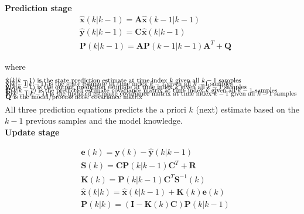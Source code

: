 \textbf{Prediction stage}
\begin{align}
	&\hat{\textbf{x}}	(k|k-1) = \textbf{A} 	\hat{\textbf{x}}(k-1|k-1)  				\label{eq:Kalman_pred_state} 	\\
	&\hat{\textbf{y}}	(k|k-1) = \textbf{C}	\hat{\textbf{x}}(k|k-1)										\label{eq:Kalman_pred_output} 	\\
	&\textbf{P}			(k|k-1) = \textbf{A}	\textbf{P}(k-1|k-1)\textbf{A}^T+\textbf{Q} 								\label{eq:Kalman_pred_cov} 		
\end{align}

where 
\begin{align*}
	&\text{$\hat{\textbf{x}}	(k|k-1)$ 	is the state prediction 			estimate at time index $k$ 		given all $ k-1 $ samples		}	\\[-1em]
	&\text{$\hat{\textbf{x}}	(k-1|k-1)$ 	is the state 						estimate at time index $k-1$ 	given all $ k-1 $ samples		}	\\[-1em]
	&\text{$\hat{\textbf{y}}	(k|k-1)$ 	is the output prediction 			estimate at time index $k$ 		given all $ k-1 $ samples		}	\\[-1em]
	&\text{$\textbf{P}			(k|k-1)$ 	is the predicted estimate  covariance matrix at time index $k$ 		given all $ k-1 $ samples		}	\\[-1em]
	&\text{$\textbf{P}			(k-1|k-1)$ 	is the updated estimate    covariance matrix at time index $k-1$ 	given all $ k-1 $ samples		}	\\[-1em]
	&\text{$\textbf{Q}$						is the model/process noise covariance matrix														}	\\[-1em]
\end{align*}

All three prediction equations predicts the a priori $k$ (next) estimate based on the $k-1$ previous samples and the model knowledge.\\
\textbf{Update stage}

\begin{align}
	&\textbf{e}			(k) 		= \textbf{y}(k) - \hat{\textbf{y}}(k|k-1)							\label{eq:Kalman_upd_inno}			\\
	&\textbf{S}			(k) 		= \textbf{C}\textbf{P}(k|k-1)\textbf{C}^T + \textbf{R}				\label{eq:Kalman_upd_inno_cov}		\\
	&\textbf{K}			(k) 		= \textbf{P}(k|k-1)\textbf{C}^T\textbf{S}^{-1}(k)					\label{eq:Kalman_upd_kalman_gain}	\\
	&\hat{\textbf{x}}	(k|k) 		= \hat{\textbf{x}}(k|k-1) + \textbf{K}(k)\textbf{e}(k) 				\label{eq:Kalman_upd_est_state}		\\
	&\textbf{P}			(k|k) 		= (\textbf{I} - \textbf{K}(k)\textbf{C})\textbf{P}(k|k-1)			\label{eq:Kalman_upd_est_cov}
\end{align}

